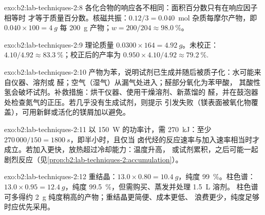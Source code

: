 \begin{solution}{exo:b2:lab-techniques-2:8}
各化合物的响应各不相同：面积百分数只有在响应因子相等时
才等于质量百分数。核磁共振：$0.12/3 = 0.040$~mol 杂质每摩尔产物，即 $0.040 \times 100 = \qty{4}{g}$
每 \qty{200}{g} 产物；$w = 200/204 \approx 98.0~\%$。
\end{solution}

\begin{solution}{exo:b2:lab-techniques-2:9}
理论质量 $0.0300 \times 164 = \qty{4.92}{g}$。未校正：$4.10/4.92 \approx 83.3~\%$；校正后的产率为
$0.950 \times 4.10/4.92 \approx 79.2~\%$.
\end{solution}

\begin{solution}{exo:b2:lab-techniques-2:10}
产物为苯，说明试剂已生成并随后被质子化：水可能来自仪器、溶剂或
醛；空气（湿气）从漏气处进入；醛部分氧化为苯甲酸，
其酸性氢会破坏试剂。补救措施：烘干仪器、使用干燥溶剂、新蒸馏的
醛，并在鼓泡器处检查氮气的正压。若几乎没有生成试剂，则提示
引发失败（镁表面被氧化物覆盖），可用新鲜或活化的镁屑加以避免。
\end{solution}

\begin{solution}{exo:b2:lab-techniques-2:11}
以 \qty{150}{W} 的功率计，需 \qty{270}{kJ}：至少 $270\,000/150 = \qty{1800}{s}$，即半小时，且仅当
卤代烃的反应速率与加入速率相当时才成立。若加入更快，放热超过冷却能力：温度升高，
或试剂累积，之后可能一起剧烈反应（见\cref{prop:b2:lab-techniques-2:accumulation}）。
\end{solution}

\begin{solution}{exo:b2:lab-techniques-2:12}
重结晶：$13.0 \times 0.80 = \qty{10.4}{g}$，纯度 99~\%。柱色谱：$13.0 \times 0.95 =
\qty{12.4}{g}$，纯度 99.5~\%，但需购买、蒸发并处理 \qty{1.5}{L} 溶剂。
柱色谱可多得约 \qty{2}{g} 纯度稍高的产物；重结晶更简便、成本更低、
浪费更少，纯度足够时应优先采用。
\end{solution}

